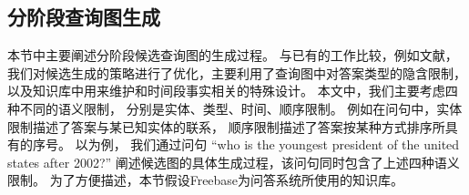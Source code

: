 

\subsection{分阶段查询图生成}
\label{sec:compqa-candgen}

本节中主要阐述分阶段候选查询图的生成过程。
与已有的工作比较，例如文献\parencite{bao2016constraint}，
我们对候选生成的策略进行了优化，主要利用了查询图中对答案类型的隐含限制，
以及知识库中用来维护和时间段事实相关的特殊设计。
本文中，我们主要考虑四种不同的语义限制，
分别是实体、类型、时间、顺序限制。
例如在问句中，实体限制描述了答案与某已知实体的联系，
顺序限制描述了答案按某种方式排序所具有的序号。
以为例，
我们通过问句 ``who is the youngest president of the united states after 2002?''
阐述候选图的具体生成过程，该问句同时包含了上述四种语义限制。
为了方便描述，本节假设Freebase为问答系统所使用的知识库。



